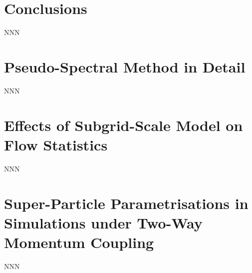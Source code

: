 \documentclass{pracamgren}
\begin{document}
\chapter*{Conclusions}
\label{ch:end}

NNN


\appendix
\chapter{Pseudo-Spectral Method in Detail}
\label{app:psm}

NNN



\chapter{Effects of Subgrid-Scale Model on Flow Statistics}
\label{app:sgs}

NNN


\chapter{Super-Particle Parametrisations in Simulations under Two-Way Momentum Coupling}
\label{app:spp}

NNN


\printbibliography[title=References]
\end{document}

